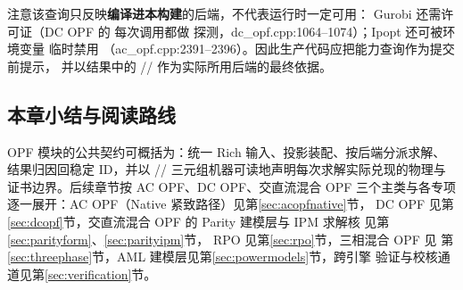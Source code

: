注意该查询只反映\textbf{编译进本构建}的后端，不代表运行时一定可用：
Gurobi 还需许可证（DC OPF 的  每次调用都做
 探测，dc\_opf.cpp:1064--1074）；Ipopt 还可被环境变量
 临时禁用
（ac\_opf.cpp:2391--2396）。因此生产代码应把能力查询作为提交前提示，
并以结果中的 //
 作为实际所用后端的最终依据。

\subsection{本章小结与阅读路线}\label{subsec:overview-reading}

OPF 模块的公共契约可概括为：统一 Rich 输入、投影装配、按后端分派求解、
结果归因回稳定 ID，并以 //
 三元组机器可读地声明每次求解实际兑现的物理与
证书边界。后续章节按 AC OPF、DC OPF、交直流混合 OPF 三个主类与各专项
逐一展开：AC OPF（Native 紧致路径）见第\ref{sec:acopfnative}节，
DC OPF 见第\ref{sec:dcopf}节，交直流混合 OPF 的 Parity 建模层与 IPM 求解核
见第\ref{sec:parityform}、\ref{sec:parityipm}节，
RPO 见第\ref{sec:rpo}节，三相混合 OPF 见
第\ref{sec:threephase}节，AML 建模层见第\ref{sec:powermodels}节，跨引擎
验证与校核通道见第\ref{sec:verification}节。
